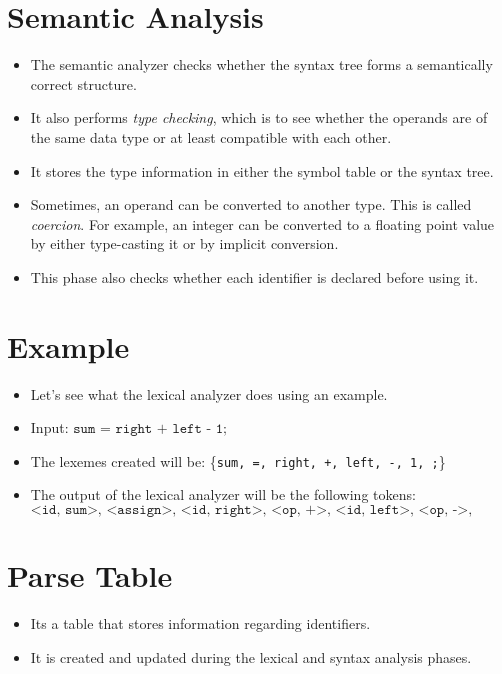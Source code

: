 \documentclass[hidelinks]{article}
\begin{document}
\section{Semantic Analysis}
    \begin{itemize}
        \item The semantic analyzer checks whether the syntax tree forms a semantically correct structure. 
        \item It also performs \textit{type checking}, which is to see whether the operands are of the same data type or at least compatible with each other.
        \item It stores the type information in either the symbol table or the syntax tree.
        \item Sometimes, an operand can be converted to another type. This is called \textit{coercion}. For example, an integer can be converted to a floating point value by either type-casting it or by implicit conversion.
        \item This phase also checks whether each identifier is declared before using it.
    \end{itemize}

\section{Example}
    \begin{itemize}
        \item Let's see what the lexical analyzer does using an example.
        \item Input: $\texttt{sum = right + left - 1;}$
        \item The lexemes created will be: \{\texttt{sum, =, right, +, left, -, 1, ;}\}
        \item The output of the lexical analyzer will be the following tokens: 
        $$\texttt{<id, sum>, <assign>, <id, right>, <op, +>, <id, left>, <op, ->, <num, 1>, <punct, ;>}$$
    \end{itemize}

\section{Parse Table}
    \begin{itemize}
        \item Its a table that stores information regarding identifiers.
        \item It is created and updated during the lexical and syntax analysis phases.
    \end{itemize}
\end{document}
